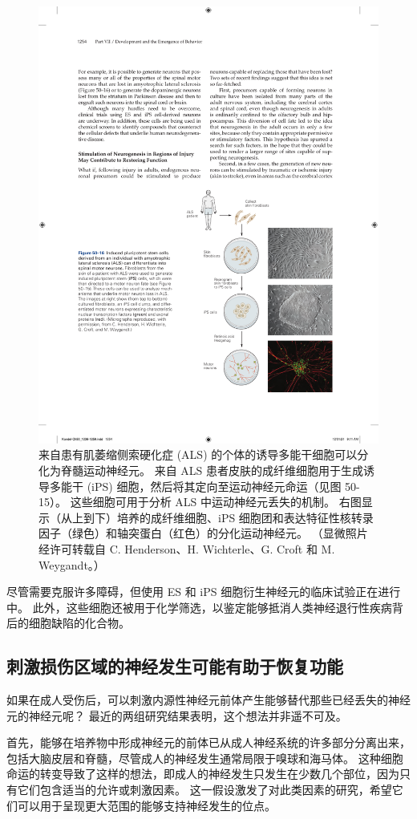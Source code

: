 \begin{figure}[htbp]
	\centering
	\includegraphics[width=0.7\linewidth]{chap50/fig_50_16}
	\caption{来自患有肌萎缩侧索硬化症 (ALS) 的个体的诱导多能干细胞可以分化为脊髓运动神经元。 来自 ALS 患者皮肤的成纤维细胞用于生成诱导多能干 (iPS) 细胞，然后将其定向至运动神经元命运（见图 50-15）。 这些细胞可用于分析 ALS 中运动神经元丢失的机制。 右图显示（从上到下）培养的成纤维细胞、iPS 细胞团和表达特征性核转录因子（绿色）和轴突蛋白（红色）的分化运动神经元。 （显微照片经许可转载自 C. Henderson、H. Wichterle、G. Croft 和 M. Weygandt。）}
	\label{fig:50_16}
\end{figure}

尽管需要克服许多障碍，但使用 ES 和 iPS 细胞衍生神经元的临床试验正在进行中。 此外，这些细胞还被用于化学筛选，以鉴定能够抵消人类神经退行性疾病背后的细胞缺陷的化合物。

\subsection{刺激损伤区域的神经发生可能有助于恢复功能}
如果在成人受伤后，可以刺激内源性神经元前体产生能够替代那些已经丢失的神经元的神经元呢？ 最近的两组研究结果表明，这个想法并非遥不可及。

首先，能够在培养物中形成神经元的前体已从成人神经系统的许多部分分离出来，包括大脑皮层和脊髓，尽管成人的神经发生通常局限于嗅球和海马体。 这种细胞命运的转变导致了这样的想法，即成人的神经发生只发生在少数几个部位，因为只有它们包含适当的允许或刺激因素。 这一假设激发了对此类因素的研究，希望它们可以用于呈现更大范围的能够支持神经发生的位点。

